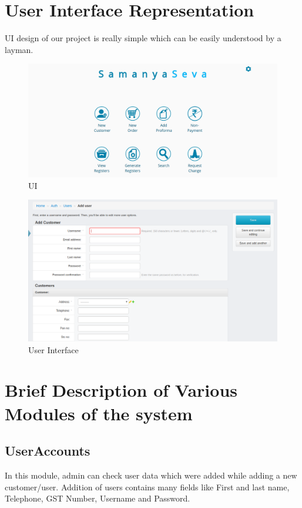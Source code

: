 \section{User Interface Representation}
UI design of our project is really simple which can be easily understood by a layman.
\begin{figure}[h!]
\centering \includegraphics[scale=0.4]{input/images/samanya1.png}
\caption{ UI}
\label{fig:UI1}
\end{figure}

\begin{figure}[h!]
\centering \includegraphics[scale=0.4]{input/images/ui.png}
\caption{ User Interface}
\label{fig:UI1}
\end{figure}

\section{ Brief Description of Various Modules of the system}
\subsection{UserAccounts}
In this module, admin can check user data which were added while adding a new customer/user. Addition of users contains many fields like First and last name, Telephone, GST Number, Username and Password.

